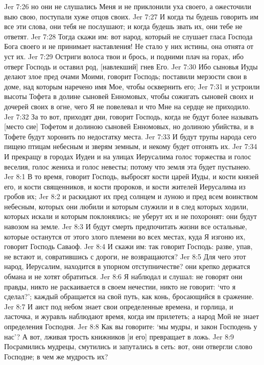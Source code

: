 Jer 7:26  но они не слушались Меня и не приклонили уха своего, а ожесточили выю свою, поступали хуже отцов своих.
Jer 7:27  И когда ты будешь говорить им все эти слова, они тебя не послушают; и когда будешь звать их, они тебе не ответят.
Jer 7:28  Тогда скажи им: вот народ, который не слушает гласа Господа Бога своего и не принимает наставления! Не стало у них истины, она отнята от уст их.
Jer 7:29  Остриги волоса твои и брось, и подними плач на горах, ибо отверг Господь и оставил род, [навлекший] гнев Его.
Jer 7:30  Ибо сыновья Иуды делают злое пред очами Моими, говорит Господь; поставили мерзости свои в доме, над которым наречено имя Мое, чтобы осквернить его;
Jer 7:31  и устроили высоты Тофета в долине сыновей Енномовых, чтобы сожигать сыновей своих и дочерей своих в огне, чего Я не повелевал и что Мне на сердце не приходило.
Jer 7:32  За то вот, приходят дни, говорит Господь, когда не будут более называть [место сие] Тофетом и долиною сыновей Енномовых, но долиною убийства, и в Тофете будут хоронить по недостатку места.
Jer 7:33  И будут трупы народа сего пищею птицам небесным и зверям земным, и некому будет отгонять их.
Jer 7:34  И прекращу в городах Иудеи и на улицах Иерусалима голос торжества и голос веселия, голос жениха и голос невесты; потому что земля эта будет пустынею.
Jer 8:1  В то время, говорит Господь, выбросят кости царей Иуды, и кости князей его, и кости священников, и кости пророков, и кости жителей Иерусалима из гробов их;
Jer 8:2  и раскидают их пред солнцем и луною и пред всем воинством небесным, которых они любили и которым служили и в след которых ходили, которых искали и которым поклонялись; не уберут их и не похоронят: они будут навозом на земле.
Jer 8:3  И будут смерть предпочитать жизни все остальные, которые останутся от этого злого племени во всех местах, куда Я изгоню их, говорит Господь Саваоф.
Jer 8:4  И скажи им: так говорит Господь: разве, упав, не встают и, совратившись с дороги, не возвращаются?
Jer 8:5  Для чего этот народ, Иерусалим, находится в упорном отступничестве? они крепко держатся обмана и не хотят обратиться.
Jer 8:6  Я наблюдал и слушал: не говорят они правды, никто не раскаивается в своем нечестии, никто не говорит: `что я сделал?'; каждый обращается на свой путь, как конь, бросающийся в сражение.
Jer 8:7  И аист под небом знает свои определенные времена, и горлица, и ласточка, и журавль наблюдают время, когда им прилететь; а народ Мой не знает определения Господня.
Jer 8:8  Как вы говорите: `мы мудры, и закон Господень у нас'? А вот, лживая трость книжников [и его] превращает в ложь.
Jer 8:9  Посрамились мудрецы, смутились и запутались в сеть: вот, они отвергли слово Господне; в чем же мудрость их?
